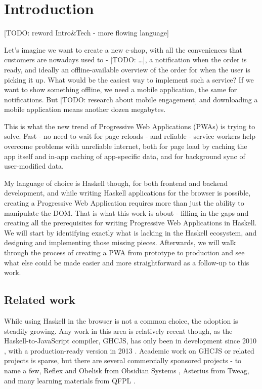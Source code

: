 \documentclass[english,odsaz]{fitthesis}
\date{\today}
\title{}
\begin{document}
\maketitle
\setlength{\parskip}{0pt}
{\hypersetup{hidelinks}\tableofcontents}
\iftotalfigures\listoffigures\fi
\iftotaltables\listoftables\fi
\iftwoside\cleardoublepage\fi
\setlength{\parskip}{0.5\bigskipamount}

\chapter{Introduction}
\label{sec:org0480750}
[TODO: reword Intro\&Tech - more flowing language]

Let's imagine we want to create a new e-shop, with all the conveniences that
customers are nowadays used to - [TODO: \ldots{}], a notification when the order is
ready, and ideally an offline-available overview of the order for when the user
is picking it up. What would be the easiest way to implement such a service? If
we want to show something offline, we need a mobile application, the same for
notifications. But [TODO: research about mobile engagement] and downloading a
mobile application means another dozen megabytes.

This is what the new trend of Progressive Web Applications (PWAs) is trying to
solve. Fast - no need to wait for page reloads - and reliable - service workers help
overcome problems with unreliable internet, both for page load by caching the
app itself and in-app caching of app-specific data, and for background sync of
user-modified data.

My language of choice is Haskell though, for both frontend and backend
development, and while writing Haskell applications for the browser is possible,
creating a Progressive Web Application requires more than just the ability to
manipulate the DOM. That is what this work is about - filling in the gaps and
creating all the prerequisites for writing Progressive Web Applications in
Haskell. We will start by identifying exactly what is lacking in the Haskell
ecosystem, and designing and implementing those missing pieces. Afterwards, we
will walk through the process of creating a PWA from prototype to production and
see what else could be made easier and more straightforward as a follow-up to
this work.

\section{Related work}
\label{sec:orge7bbad3}
While using Haskell in the browser is not a common choice, the adoption is
steadily growing. Any work in this area is relatively recent though, as the
Haskell-to-JavaScript compiler, GHCJS, has only been in development since 2010
\cite{ghcjs}, with a production-ready version in 2013 \cite{ghcjs-luite}. Academic
work on GHCJS or related projects is sparse, but there are several commercially
sponsored projects - to name a few, Reflex and Obelisk from Obsidian Systems
\cite{obsidian}, Asterius from Tweag, and many learning materials from QFPL
\cite{qfpl}.
\end{document}
